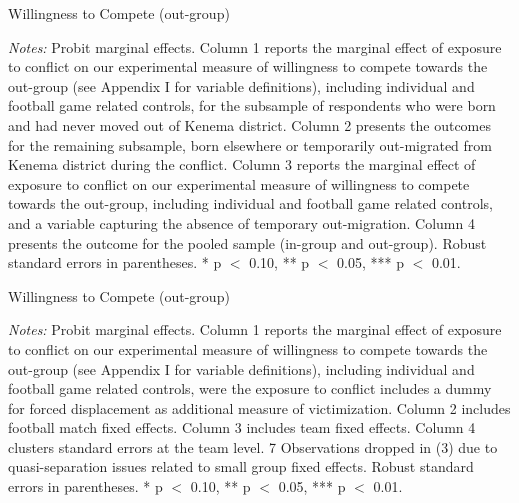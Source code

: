 \documentclass[10pt,a4paper]{scrartcl} %
\begin{document}
\begin{table}[htp]
  \caption{Willingness to Compete (out-group)}
  \label{tab:slf:compete_migrate}
\begin{threeparttable}[p!]

  \singlespacing
  \footnotesize
  
  \begin{tablenotes}
    \footnotesize
    \item \textit{Notes:} Probit marginal effects. Column 1 reports the marginal effect of exposure to conflict on our experimental measure of willingness to compete towards the out-group (see Appendix I for variable definitions), including individual and football game related controls, for the subsample of respondents who were born and had never moved out of Kenema district. Column 2 presents the outcomes for the remaining subsample, born elsewhere or temporarily out-migrated from Kenema district during the conflict. Column 3 reports the marginal effect of exposure to conflict on our experimental measure of willingness to compete towards the out-group, including individual and football game related controls, and a variable capturing the absence of temporary out-migration. Column 4 presents the outcome for the pooled sample (in-group and out-group). Robust standard errors in parentheses. * p $<$ 0.10, ** p $<$ 0.05, *** p $<$ 0.01.
    \item
  \end{tablenotes}
\end{threeparttable}
\end{table}

\pagebreak

\begin{table}[htp]
  \caption{Willingness to Compete (out-group)}
  \label{tab:slf:compete_disp}
\begin{threeparttable}[p!]

  \singlespacing
  \small
  
  \begin{tablenotes}
    \footnotesize
    \item \textit{Notes:} Probit marginal effects. Column 1 reports the marginal effect of exposure to conflict on our experimental measure of willingness to compete towards the out-group (see Appendix I for variable definitions), including individual and football game related controls, were the exposure to conflict includes a dummy for forced displacement as additional measure of victimization. Column 2 includes football match fixed effects. Column 3 includes team fixed effects. Column 4 clusters standard errors at the team level. 7 Observations dropped in (3) due to quasi-separation issues related to small group fixed effects. Robust standard errors in parentheses. * p $<$ 0.10, ** p $<$ 0.05, *** p $<$ 0.01.
    \item
  \end{tablenotes}
\end{threeparttable}
\end{table}
\end{document}
